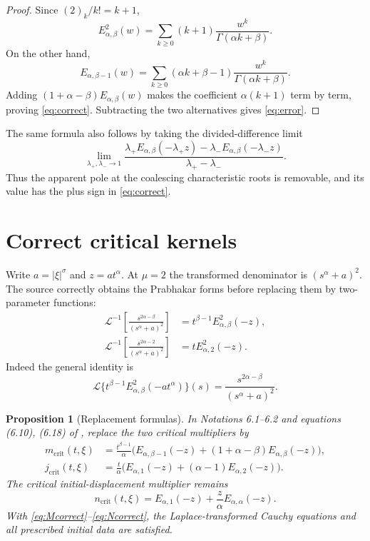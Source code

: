 \documentclass[11pt]{article}
\newtheorem{proposition}{Proposition}
\begin{document}
\begin{proof}
Since $(2)_k/k!=k+1$,
\[
 E_{\alpha,\beta}^{2}(w)
 =\sum_{k\ge0}(k+1)\frac{w^k}{\Gamma(\alpha k+\beta)}.
\]
On the other hand,
\[
 E_{\alpha,\beta-1}(w)
 =\sum_{k\ge0}(\alpha k+\beta-1)
   \frac{w^k}{\Gamma(\alpha k+\beta)}.
\]
Adding $(1+\alpha-\beta)E_{\alpha,\beta}(w)$ makes the coefficient
$\alpha(k+1)$ term by term, proving \eqref{eq:correct}.  Subtracting the
two alternatives gives \eqref{eq:error}.
\end{proof}

The same formula also follows by taking the divided-difference limit
\[
 \lim_{\lambda_+,\lambda_-\to1}
 \frac{\lambda_+E_{\alpha,\beta}(-\lambda_+z)
       -\lambda_-E_{\alpha,\beta}(-\lambda_-z)}
      {\lambda_+-\lambda_-}.
\]
Thus the apparent pole at the coalescing characteristic roots is
removable, and its value has the plus sign in \eqref{eq:correct}.

\section{Correct critical kernels}

Write $a=|\xi|^\sigma$ and $z=a t^\alpha$.  At $\mu=2$ the transformed
denominator is $(s^\alpha+a)^2$.  The source correctly obtains the
Prabhakar forms before replacing them by two-parameter functions:
\begin{align}
 \mathcal L^{-1}\!\left[\frac{s^{2\alpha-\beta}}
 {(s^\alpha+a)^2}\right]
 &=t^{\beta-1}E_{\alpha,\beta}^{2}(-z),\label{eq:Mlap}\\
 \mathcal L^{-1}\!\left[\frac{s^{2\alpha-2}}
 {(s^\alpha+a)^2}\right]
 &=tE_{\alpha,2}^{2}(-z).\label{eq:Jlap}
\end{align}
Indeed the general identity is
\[
 \mathcal L\{t^{\beta-1}E_{\alpha,\beta}^{2}(-at^\alpha)\}(s)
 =\frac{s^{2\alpha-\beta}}{(s^\alpha+a)^2}.
\]

\begin{proposition}[Replacement formulas]\label{prop:kernels}
In Notations 6.1--6.2 and equations (6.10), (6.18) of \cite{FM}, replace
the two critical multipliers by
\begin{align}
 m_{\mathrm{crit}}(t,\xi)
 &=\frac{t^{\beta-1}}{\alpha}
 \Big(E_{\alpha,\beta-1}(-z)
 +(1+\alpha-\beta)E_{\alpha,\beta}(-z)\Big),\label{eq:Mcorrect}\\
 j_{\mathrm{crit}}(t,\xi)
 &=\frac{t}{\alpha}
 \Big(E_{\alpha,1}(-z)
 +(\alpha-1)E_{\alpha,2}(-z)\Big).\label{eq:Jcorrect}
\end{align}
The critical initial-displacement multiplier remains
\begin{equation}\label{eq:Ncorrect}
 n_{\mathrm{crit}}(t,\xi)
 =E_{\alpha,1}(-z)+\frac{z}{\alpha}E_{\alpha,\alpha}(-z).
\end{equation}
With \eqref{eq:Mcorrect}--\eqref{eq:Ncorrect}, the Laplace-transformed
Cauchy equations and all prescribed initial data are satisfied.
\end{proposition}
\end{document}
